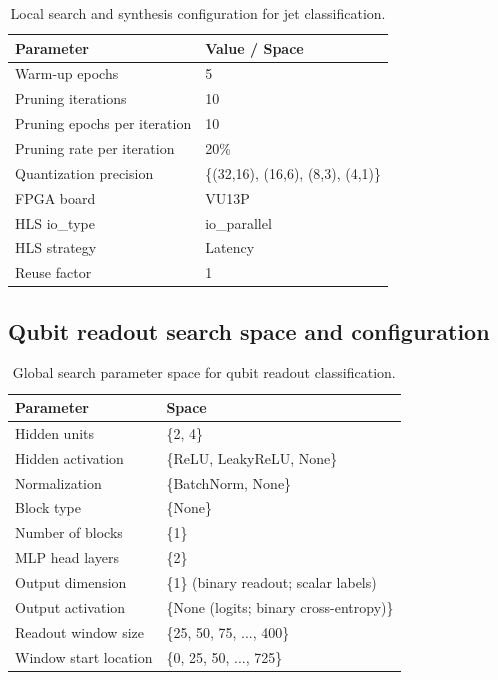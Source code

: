\documentclass[11pt]{article}
\begin{document}
\begin{table}[H]
  \caption{Local search and synthesis configuration for jet classification.}
  \label{tab:mlp-local-search-table}
  \centering
  \small
  \renewcommand{\arraystretch}{1.2}
  \begin{tabular}{ll}
    \toprule
    \textbf{Parameter} & \textbf{Value / Space} \\
    \midrule
    Warm-up epochs & 5 \\
    Pruning iterations & 10 \\
    Pruning epochs per iteration & 10 \\
    Pruning rate per iteration & 20\% \\
    Quantization precision & \{(32,16), (16,6), (8,3), (4,1)\} \\
    FPGA board & VU13P \\
    HLS io\_type & io\_parallel \\
    HLS strategy & Latency \\
    Reuse factor & 1 \\
    \bottomrule
  \end{tabular}
\end{table}

\subsection{Qubit readout search space and configuration}
\label{app:qubit-search-config}

\begin{table}[H]
  \caption{Global search parameter space for qubit readout classification.}
  \label{tab:qubit-global-parameter-table}
  \centering
  \small
  \renewcommand{\arraystretch}{1.2}
  \begin{tabular}{ll}
    \toprule
    \textbf{Parameter} & \textbf{Space} \\
    \midrule
    Hidden units & \{2, 4\} \\
    Hidden activation & \{ReLU, LeakyReLU, None\} \\
    Normalization & \{BatchNorm, None\} \\
    Block type & \{None\} \\
    Number of blocks & \{1\} \\
    MLP head layers & \{2\} \\
    Output dimension & \{1\} (binary readout; scalar labels) \\
    Output activation & \{None (logits; binary cross-entropy)\} \\
    Readout window size &
    \{25, 50, 75, ..., 400\} \\
    Window start location &
    \{0, 25, 50, ..., 725\} \\
    \bottomrule
  \end{tabular}
\end{table}
\end{document}
